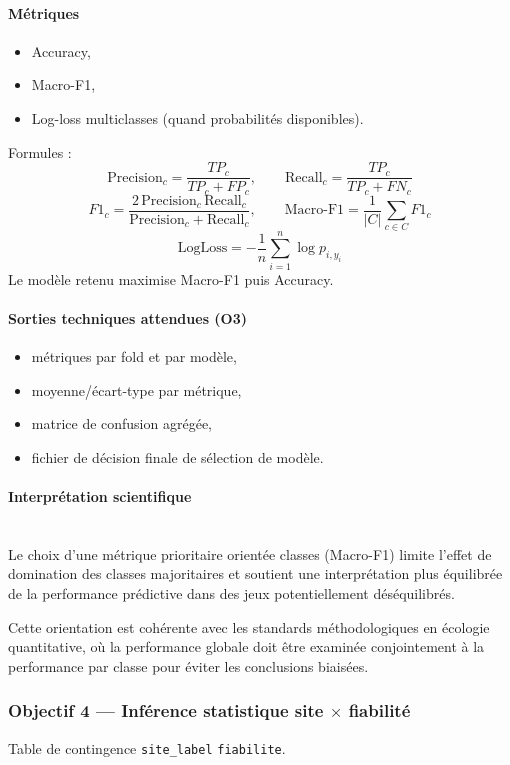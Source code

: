 \documentclass[11pt,a4paper]{article}
\begin{document}
\paragraph{M\'etriques}
\begin{itemize}[leftmargin=1.2cm]
  \item Accuracy,
  \item Macro-F1,
  \item Log-loss multiclasses (quand probabilit\'es disponibles).
\end{itemize}

Formules :
\[
\text{Precision}_c=\frac{TP_c}{TP_c+FP_c},
\qquad
\text{Recall}_c=\frac{TP_c}{TP_c+FN_c}
\]
\[
F1_c=\frac{2\,\text{Precision}_c\,\text{Recall}_c}{\text{Precision}_c+\text{Recall}_c},
\qquad
\text{Macro-F1}=\frac{1}{|C|}\sum_{c\in C}F1_c
\]
\[
\text{LogLoss}=-\frac{1}{n}\sum_{i=1}^{n}\log p_{i,y_i}
\]
Le modèle retenu maximise Macro-F1 puis Accuracy.

\paragraph{Sorties techniques attendues (O3)}
\begin{itemize}[leftmargin=1.2cm]
  \item m\'etriques par fold et par modèle,
  \item moyenne/\'ecart-type par m\'etrique,
  \item matrice de confusion agr\'eg\'ee,
  \item fichier de d\'ecision finale de s\'election de modèle.
\end{itemize}

\paragraph{Interpr\'etation scientifique}\leavevmode\\
Le choix d'une m\'etrique prioritaire orient\'ee classes (Macro-F1) limite
l'effet de domination des classes majoritaires et soutient une interpr\'etation
plus \'equilibr\'ee de la performance pr\'edictive dans des jeux potentiellement d\'es\'equilibr\'es.

Cette orientation est coh\'erente avec les standards m\'ethodologiques
en \'ecologie quantitative, où la performance globale doit être examin\'ee
conjointement à la performance par classe pour \'eviter les conclusions biais\'ees.

\subsubsection{\texorpdfstring{Objectif 4 --- Inf\'erence statistique site $\times$ fiabilit\'e}{Objectif 4 --- Inf\'erence statistique site x fiabilit\'e}}
Table de contingence \texttt{site\_label} \texttimes{} \texttt{fiabilite}.
\end{document}
